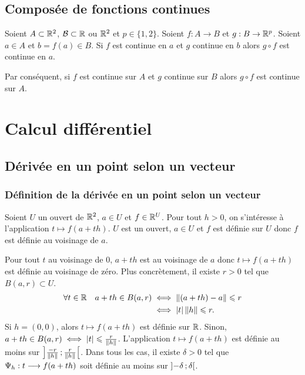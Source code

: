 \subsection{Composée de fonctions continues}

\begin{theo}
  Soient \(A \subset \mathbb{R}^2\), \(\mathcal{B}\subset \mathbb{R}\) ou \(\mathbb{R}^2\) et \(p \in \{1, 2\}\). Soient \(f : A \rightarrow B\) et \(g: B \rightarrow \mathbb{R}^p\). Soient \(a \in A\) et \(b=f(a) \in B\). Si \(f\) est continue en \(a\) et \(g\) continue en \(b\) alors \(g \circ f\) est continue en \(a\).

Par conséquent, si \(f\) est continue sur \(A\) et \(g\) continue sur \(B\) alors \(g \circ f\) est continue sur \(A\).
\end{theo}

\section{Calcul différentiel}

\subsection{Dérivée en un point selon un vecteur}

\subsubsection{Définition de la dérivée en un point selon un vecteur}

Soient \(U\) un ouvert de \(\mathbb{R}^2\), \(a \in U\) et \(f \in \mathbb{R}^U\). Pour tout \(h>0\), on s'intéresse à l'application \(t \longmapsto f(a+th)\). \(U\) est un ouvert, \(a \in U\) et \(f\) est définie sur \(U\) donc \(f\) est définie au voisinage de \(a\).

Pour tout \(t\) au voisinage de \(0\), \(a+th\) est au voisinage de \(a\) donc \(t \longmapsto f(a+th)\) est définie au voisinage de zéro. Plus concrètement, il existe \(r>0\) tel que \(B(a, r) \subset U\).
\begin{align}
  \forall t \in \mathbb{R} \quad a+th \in B(a, r) &\iff \left\lVert(a+th)-a\right\rVert \leqslant r \\
  &\iff \left\lvert t\right\rvert \left\lVert h\right\rVert \leqslant r.
\end{align}
Si \(h=(0, 0)\), alors \(t \longmapsto f(a+th)\) est définie sur \(\mathbb{R}\). Sinon, \(a+th \in B(a, r) \iff \left\lvert t\right\rvert \leqslant \frac{r}{\left\lVert h\right\rVert}\). L'application \(t \longmapsto f(a+th)\) est définie au moins sur \(\left] \frac{-r}{\left\lVert h\right\rVert} \, ;  \frac{r}{\left\lVert h\right\rVert} \right[\). Dans tous les cas, il existe \(\delta>0\) tel que \(\Psi_h:t \longrightarrow f(a+th)\) soit définie au moins sur \(\left] -\delta \, ;  \delta \right[\). 

